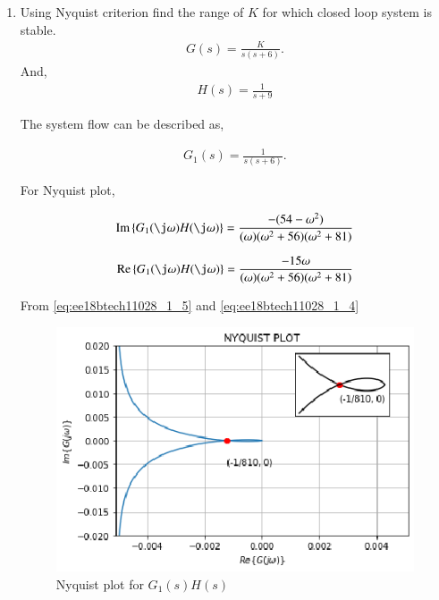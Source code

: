\begin{enumerate}[label=\thesection.\arabic*.,ref=\thesection.\theenumi]
\item Using Nyquist criterion find the range of $K$ for which closed loop system is stable.
\begin{align}
    G(s) = \frac{K}{s(s+6)}. 
    \label{eq:ee18btech11028_1_1}
\end{align}
And,
\begin{align}
    H(s) = \frac{1}{s+9}
    \label{eq:ee18btech11028_1_2}
\end{align}

\solution
The system flow can be described as,

\begin{figure}[!ht]
    \begin{center}
        \resizebox{\columnwidth}{!}{}
    \end{center}
    \caption{}  
    \label{fig:ee18btech11028_1_fig1}
\end{figure}


\begin{align}
    G_{1}(s) = \frac{1}{s(s+6)}. 
    \label{eq:ee18btech11028_1_3}
\end{align}

For Nyquist plot, 

\begin{align}
    \text{Im} \cbrak{G_{1}(\j \omega)H(\j \omega)}= \frac{-(54 - \omega^{2})}{(\omega)(\omega^{2}+56)(\omega^{2} + 81)}
    \label{eq:ee18btech11028_1_5}
\end{align}


\begin{align}
    \text{Re} \cbrak{G_{1}(\j \omega)H(\j \omega)}= \frac{-15 \omega}{(\omega)(\omega^{2}+56)(\omega^{2} + 81)}
    \label{eq:ee18btech11028_1_4}
\end{align}

From \eqref{eq:ee18btech11028_1_5} and \eqref{eq:ee18btech11028_1_4}

\begin{figure}[!h]
\includegraphics[width=\columnwidth]{./figs/ee18btech11028/ee18btech11028_1.eps}
    \centering
  \caption{Nyquist plot for $G_{1}(s)H(s)$}
  \label{fig:ee18btech11028_1_fig2}
\end{figure}



\end{enumerate}
